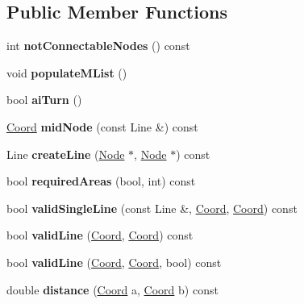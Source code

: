 \subsection*{Public Member Functions}
\begin{DoxyCompactItemize}
\item 
\hypertarget{classGameAI_ab36abdfff623feb9e4541c59752c2132}{int {\bfseries not\+Connectable\+Nodes} () const }\label{classGameAI_ab36abdfff623feb9e4541c59752c2132}

\item 
\hypertarget{classGameAI_a90f4924b104ca8a98b054cc4d12c779c}{void {\bfseries populate\+M\+List} ()}\label{classGameAI_a90f4924b104ca8a98b054cc4d12c779c}

\item 
\hypertarget{classGameAI_a12c06fd7a0c68da5af485e41048f0cc7}{bool {\bfseries ai\+Turn} ()}\label{classGameAI_a12c06fd7a0c68da5af485e41048f0cc7}

\item 
\hypertarget{classGameAI_afe0272443eed1a1392caf8c19380e502}{\hyperlink{structCoord}{Coord} {\bfseries mid\+Node} (const Line \&) const }\label{classGameAI_afe0272443eed1a1392caf8c19380e502}

\item 
\hypertarget{classGameAI_ad21315504d9b3bd4c00ce9effcd3909e}{Line {\bfseries create\+Line} (\hyperlink{classNode}{Node} $\ast$, \hyperlink{classNode}{Node} $\ast$) const }\label{classGameAI_ad21315504d9b3bd4c00ce9effcd3909e}

\item 
\hypertarget{classGameAI_a3f36972f212c2f0b65c03c0674d0383b}{bool {\bfseries required\+Areas} (bool, int) const }\label{classGameAI_a3f36972f212c2f0b65c03c0674d0383b}

\item 
\hypertarget{classGameAI_a4c6c1706af32bb21c81d8b5c2c4d37d9}{bool {\bfseries valid\+Single\+Line} (const Line \&, \hyperlink{structCoord}{Coord}, \hyperlink{structCoord}{Coord}) const }\label{classGameAI_a4c6c1706af32bb21c81d8b5c2c4d37d9}

\item 
\hypertarget{classGameAI_ac6a810b45dfec6db6d4f53f5c96106b3}{bool {\bfseries valid\+Line} (\hyperlink{structCoord}{Coord}, \hyperlink{structCoord}{Coord}) const }\label{classGameAI_ac6a810b45dfec6db6d4f53f5c96106b3}

\item 
\hypertarget{classGameAI_a2683127876773a7aa917deefe8ba6eeb}{bool {\bfseries valid\+Line} (\hyperlink{structCoord}{Coord}, \hyperlink{structCoord}{Coord}, bool) const }\label{classGameAI_a2683127876773a7aa917deefe8ba6eeb}

\item 
\hypertarget{classGameAI_ac49f4598c7f141ee226cc83e59c1c61d}{double {\bfseries distance} (\hyperlink{structCoord}{Coord} a, \hyperlink{structCoord}{Coord} b) const }\label{classGameAI_ac49f4598c7f141ee226cc83e59c1c61d}

\end{DoxyCompactItemize}

